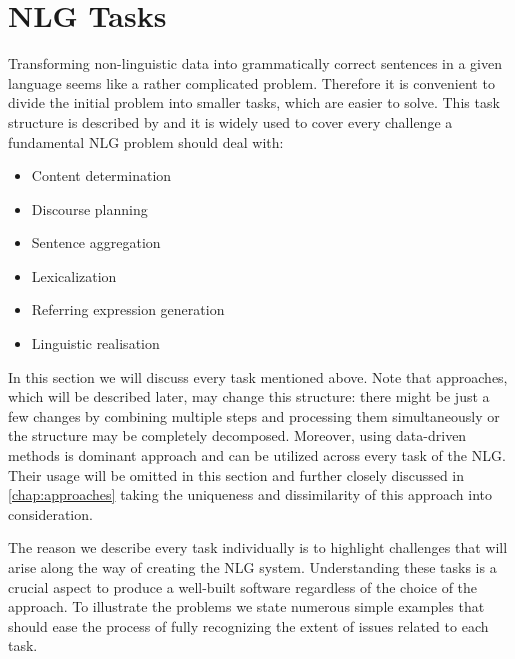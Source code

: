 \chapter{NLG Tasks}\label{chap:tasks}
Transforming non-linguistic data into grammatically correct sentences in a given language seems like a rather complicated problem. Therefore it is convenient to divide the initial problem into smaller tasks, which are easier to solve. This task structure is described by \cite{reiter1997building} and it is widely used to cover every challenge a fundamental NLG problem should deal with:
\begin{itemize}
	\item Content determination
	\item Discourse planning
	\item Sentence aggregation
	\item Lexicalization
	\item Referring expression generation
	\item Linguistic realisation
\end{itemize}

In this section we will discuss every task mentioned above. Note that approaches, which will be described later, may change this structure: there might be just a few changes by combining multiple steps and processing them simultaneously or the structure may be completely decomposed. Moreover, using data-driven methods is dominant approach and can be utilized across every task of the NLG. Their usage will be omitted in this section and further closely discussed in \autoref{chap:approaches} taking the uniqueness and dissimilarity of this approach into consideration.

The reason we describe every task individually is to highlight challenges that will arise along the way of creating the NLG system. Understanding these tasks is a crucial aspect to produce a well-built software regardless of the choice of the approach. To illustrate the problems we state numerous simple examples that should ease the process of fully recognizing the extent of issues related to each task.

